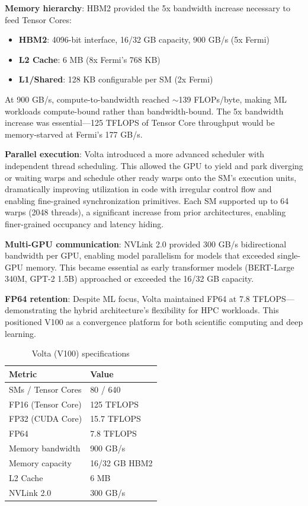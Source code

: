 \documentclass{article}
\begin{document}
\textbf{Memory hierarchy}: HBM2 provided the 5x bandwidth increase necessary to feed Tensor Cores:
\begin{itemize}
\item \textbf{HBM2}: 4096-bit interface, 16/32 GB capacity, 900 GB/s (5x Fermi)
\item \textbf{L2 Cache}: 6 MB (8x Fermi's 768 KB)
\item \textbf{L1/Shared}: 128 KB configurable per SM (2x Fermi)
\end{itemize}
At 900 GB/s, compute-to-bandwidth reached $\sim$139 FLOPs/byte, making ML workloads compute-bound rather than bandwidth-bound. The 5x bandwidth increase was essential—125 TFLOPS of Tensor Core throughput would be memory-starved at Fermi's 177 GB/s.

\textbf{Parallel execution}: Volta introduced a more advanced scheduler with independent thread scheduling. This allowed the GPU to yield and park diverging or waiting warps and schedule other ready warps onto the SM's execution units, dramatically improving utilization in code with irregular control flow and enabling fine-grained synchronization primitives. Each SM supported up to 64 warps (2048 threads), a significant increase from prior architectures, enabling finer-grained occupancy and latency hiding.

\textbf{Multi-GPU communication}: NVLink 2.0 provided 300 GB/s bidirectional bandwidth per GPU, enabling model parallelism for models that exceeded single-GPU memory. This became essential as early transformer models (BERT-Large 340M, GPT-2 1.5B) approached or exceeded the 16/32 GB capacity.

\textbf{FP64 retention}: Despite ML focus, Volta maintained FP64 at 7.8 TFLOPS—demonstrating the hybrid architecture's flexibility for HPC workloads. This positioned V100 as a convergence platform for both scientific computing and deep learning.

\begin{table}[h]
\centering\small
\begin{tabular}{ll}
\toprule
Metric & Value \\
\midrule
SMs / Tensor Cores & 80 / 640 \\
FP16 (Tensor Core) & 125 TFLOPS \\
FP32 (CUDA Core) & 15.7 TFLOPS \\
FP64 & 7.8 TFLOPS \\
Memory bandwidth & 900 GB/s \\
Memory capacity & 16/32 GB HBM2 \\
L2 Cache & 6 MB \\
NVLink 2.0 & 300 GB/s \\
\bottomrule
\end{tabular}
\caption{Volta (V100) specifications}
\end{table}
\end{document}
